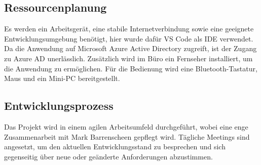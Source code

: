 \subsection{Ressourcenplanung}
\label{sec:Ressourcenplanung}

Es werden ein Arbeitsgerät, eine stabile Internetverbindung sowie eine geeignete Entwicklungsumgebung benötigt, hier wurde dafür VS Code als IDE verwendet.
Da die Anwendung auf Microsoft Azure Active Directory zugreift, ist der Zugang zu Azure AD unerlässlich.
Zusätzlich wird im Büro ein Fernseher installiert, um die Anwendung zu ermöglichen.
Für die Bedienung wird eine Bluetooth-Tastatur, Maus und ein Mini-PC bereitgestellt.


\subsection{Entwicklungsprozess}
\label{sec:Entwicklungsprozess}
Das Projekt wird in einem agilen Arbeitsumfeld durchgeführt, wobei eine enge Zusammenarbeit mit Mark Barrenscheen gepflegt wird.
Tägliche Meetings sind angesetzt, um den aktuellen Entwicklungsstand zu besprechen und sich gegenseitig über neue oder geänderte Anforderungen abzustimmen.
